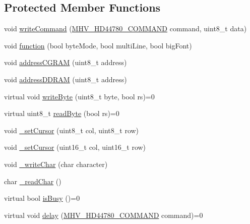 \subsection*{\-Protected \-Member \-Functions}
\begin{DoxyCompactItemize}
\item 
void \hyperlink{class_m_h_v___display___h_d44780_a99ad2131b4ea26638a75f865a740c7ed}{write\-Command} (\hyperlink{_m_h_v___display___h_d44780_8h_a76bff68a0c366080486a09e3beec77e1}{\-M\-H\-V\-\_\-\-H\-D44780\-\_\-\-C\-O\-M\-M\-A\-N\-D} command, uint8\-\_\-t data)
\item 
void \hyperlink{class_m_h_v___display___h_d44780_ab8c89d4e57ae1008ab553e2f890129a3}{function} (bool byte\-Mode, bool multi\-Line, bool big\-Font)
\item 
void \hyperlink{class_m_h_v___display___h_d44780_a9e601dd017a6d9f4e2bdc37efe49a13d}{address\-C\-G\-R\-A\-M} (uint8\-\_\-t address)
\item 
void \hyperlink{class_m_h_v___display___h_d44780_af8eb6f055b4a28b63422a53e6d4190e7}{address\-D\-D\-R\-A\-M} (uint8\-\_\-t address)
\item 
virtual void \hyperlink{class_m_h_v___display___h_d44780_ad1691510b6d35301e4182edcf11d81db}{write\-Byte} (uint8\-\_\-t byte, bool rs)=0
\item 
virtual uint8\-\_\-t \hyperlink{class_m_h_v___display___h_d44780_a5f35b3083cca3fb405b4f56a631cbc63}{read\-Byte} (bool rs)=0
\item 
void \hyperlink{class_m_h_v___display___h_d44780_ab59dcf627ffb487a0a63e92cdfce7373}{\-\_\-set\-Cursor} (uint8\-\_\-t col, uint8\-\_\-t row)
\item 
void \hyperlink{class_m_h_v___display___h_d44780_a70c2bd4ead6aa04eb0f198842ea7c278}{\-\_\-set\-Cursor} (uint16\-\_\-t col, uint16\-\_\-t row)
\item 
void \hyperlink{class_m_h_v___display___h_d44780_a7a46e31a6ee22db0cf3132630eb88554}{\-\_\-write\-Char} (char character)
\item 
char \hyperlink{class_m_h_v___display___h_d44780_ad0fb71213a916a4a85fedf8f5d25316e}{\-\_\-read\-Char} ()
\item 
virtual bool \hyperlink{class_m_h_v___display___h_d44780_a667d9f8ca08b3021fea77a47cf6c1965}{is\-Busy} ()=0
\item 
virtual void \hyperlink{class_m_h_v___display___h_d44780_a8a6017accb4910deb470ce2d1a5b5fc5}{delay} (\hyperlink{_m_h_v___display___h_d44780_8h_a76bff68a0c366080486a09e3beec77e1}{\-M\-H\-V\-\_\-\-H\-D44780\-\_\-\-C\-O\-M\-M\-A\-N\-D} command)=0
\end{DoxyCompactItemize}
